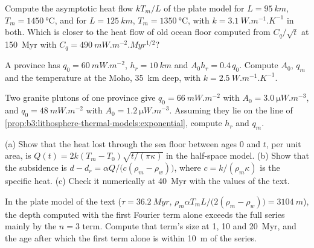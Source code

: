 \begin{exercise}[$\star\star$]\label{exo:b3:lithosphere-thermal-models:7}
Compute the asymptotic heat flow $kT_m/L$ of the plate model for $L =
\qty{95}{km}$, $T_m = \qty{1450}{\celsius}$, and for $L = \qty{125}{km}$,
$T_m = \qty{1350}{\celsius}$, with $k = \qty{3.1}{W.m^{-1}.K^{-1}}$ in both.
Which is closer to the heat flow of old ocean floor computed from $C_q/\sqrt t$
at \qty{150}{Myr} with $C_q = \qty{490}{mW.m^{-2}.Myr^{1/2}}$?
\end{exercise}

\begin{exercise}[$\star\star$]\label{exo:b3:lithosphere-thermal-models:8}
A province has $q_0 = \qty{60}{mW.m^{-2}}$, $h_r = \qty{10}{km}$ and $A_0h_r =
0.4\,q_0$. Compute $A_0$, $q_m$ and the temperature at the Moho, \qty{35}{km}
deep, with $k = \qty{2.5}{W.m^{-1}.K^{-1}}$.
\end{exercise}

\begin{exercise}[$\star\star$]\label{exo:b3:lithosphere-thermal-models:9}
Two granite plutons of one province give $q_0 = \qty{66}{mW.m^{-2}}$ with $A_0
= \qty{3.0}{\micro W.m^{-3}}$, and $q_0 = \qty{48}{mW.m^{-2}}$ with $A_0 =
\qty{1.2}{\micro W.m^{-3}}$. Assuming they lie on the line of
\cref{prop:b3:lithosphere-thermal-models:exponential}, compute $h_r$ and $q_m$.
\end{exercise}

\begin{exercise}[$\star\star\star$]\label{exo:b3:lithosphere-thermal-models:10}
(a) Show that the heat lost through the sea floor between ages 0 and $t$, per
unit area, is $Q(t) = 2k(T_m - T_0)\sqrt{t/(\pi\kappa)}$ in the half-space
model. (b) Show that the subsidence is $d - d_r = \alpha Q/\bigl(c(\rho_m -
\rho_w)\bigr)$, where $c = k/(\rho_m\kappa)$ is the specific heat. (c) Check it
numerically at \qty{40}{Myr} with the values of the text.
\end{exercise}

\begin{exercise}[$\star\star\star$]\label{exo:b3:lithosphere-thermal-models:11}
In the plate model of the text ($\tau = \qty{36.2}{Myr}$, $\rho_m\alpha T_mL/
\bigl(2(\rho_m - \rho_w)\bigr) = \qty{3104}{m}$), the depth computed with the
first Fourier term alone exceeds the full series mainly by the $n = 3$ term.
Compute that term's size at 1, 10 and \qty{20}{Myr}, and the age after which
the first term alone is within \qty{10}{m} of the series.
\end{exercise}

